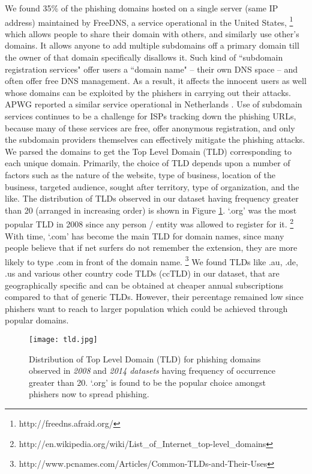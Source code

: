 \documentclass[conference]{IEEEtran}
\begin{document}
We found 35\% of the phishing domains hosted on a single server (same IP address) maintained by FreeDNS, a service operational in the United States, \footnote{http://freedns.afraid.org/} which allows people to share their domain with others, and similarly use other's domains. It allows anyone to add multiple subdomains off a primary domain till the owner of that domain specifically disallows it. Such kind of ``subdomain registration services" offer users a ``domain name" -- their own DNS space -- and often offer free DNS management. As a result, it affects the innocent users as well whose domains can be exploited by the phishers in carrying out their attacks. APWG reported a similar service operational in Netherlands \cite{apwg}. Use of subdomain services continues to be a challenge for ISPs tracking down the phishing URLs, because many of these services are free, offer anonymous registration, and only the subdomain providers themselves can effectively mitigate the phishing attacks.
\newline\indent
We parsed the domains to get the Top Level Domain (TLD) corresponding to each unique domain. Primarily, the choice of TLD depends upon a number of factors such as the nature of the website, type of business, location of the business, targeted audience, sought after territory, type of organization, and the like. The distribution of TLDs observed in our dataset having frequency greater than 20 (arranged in increasing order) is shown in Figure \ref{fig:tld}. `.org' was the most popular TLD in 2008 since any person / entity was allowed to register for it. \footnote{http://en.wikipedia.org/wiki/List\_of\_Internet\_top-level\_domains}
With time, `.com' has become the main TLD for domain names, since many people believe that if net surfers do not remember the extension, they are more likely to type .com in front of the domain name. \footnote{http://www.pcnames.com/Articles/Common-TLDs-and-Their-Uses} We found TLDs like .au, .de, .us and various other country code TLDs (ccTLD) in our dataset, that are geographically specific and can be obtained at cheaper annual subscriptions compared to that of generic TLDs. However, their percentage remained low since phishers want to reach to larger population which could be achieved through popular domains.
\begin{figure}[h]
\centering
\texttt{[image: tld.jpg]}
\caption{Distribution of Top Level Domain (TLD) for phishing domains observed in \textit{2008} and \textit{2014 datasets} having frequency of occurrence greater than 20. `.org' is found to be the popular choice amongst phishers now to spread phishing.}
\label{fig:tld}
\end{figure}
\end{document}
